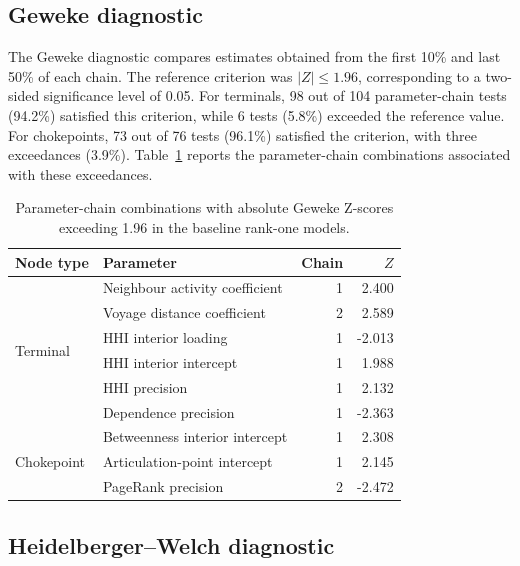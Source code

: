 \documentclass[pdftex,12pt,openright,a4paper,oneside]{book}
\begin{document}
\subsection{Geweke diagnostic}

The Geweke diagnostic compares estimates obtained
from the first 10\% and last 50\% of each chain.
The reference criterion was $|Z|\leq 1.96$,
corresponding to a two-sided significance level
of 0.05.
For terminals, 98 out of 104 parameter-chain
tests (94.2\%) satisfied this criterion, while
6 tests (5.8\%) exceeded the reference value.
For chokepoints, 73 out of 76 tests (96.1\%)
satisfied the criterion, with three exceedances
(3.9\%).
Table~\ref{tab:baseline_geweke_details}
reports the parameter-chain combinations
associated with these exceedances.

\begin{table}[htbp]
\centering
\small
\caption{Parameter-chain combinations with
absolute Geweke Z-scores exceeding 1.96
in the baseline rank-one models.}
\label{tab:baseline_geweke_details}

\begin{tabular}{llrr}
\toprule
Node type & Parameter & Chain & $Z$ \\
\midrule

\multirow{6}{*}{Terminal}
& Neighbour activity coefficient & 1 & 2.400 \\
& Voyage distance coefficient & 2 & 2.589 \\
& HHI interior loading & 1 & -2.013 \\
& HHI interior intercept & 1 & 1.988 \\
& HHI precision & 1 & 2.132 \\
& Dependence precision & 1 & -2.363 \\

\midrule

\multirow{3}{*}{Chokepoint}
& Betweenness interior intercept & 1 & 2.308 \\
& Articulation-point intercept & 1 & 2.145 \\
& PageRank precision & 2 & -2.472 \\

\bottomrule
\end{tabular}
\end{table}

\subsection{Heidelberger--Welch diagnostic}
\end{document}
